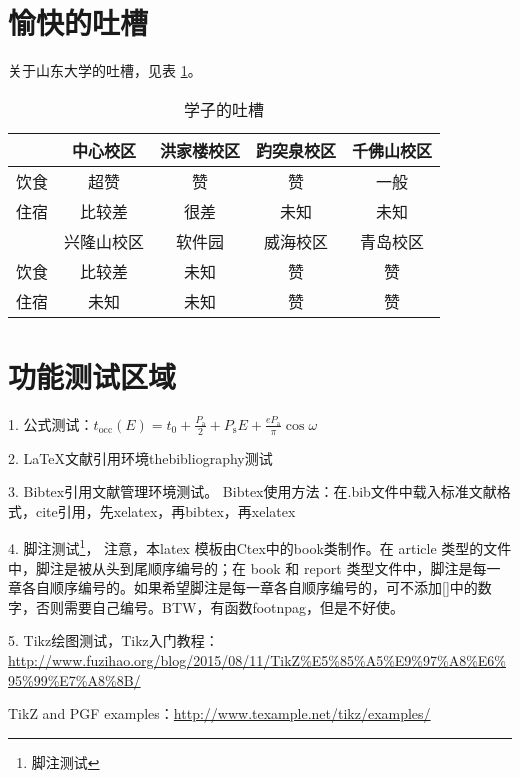 \documentclass[openany]{sduthesis} %
\begin{document}
\section{愉快的吐槽}

关于山东大学的吐槽，见表 \ref{tab:debunk}。

\begin{table}[!htb]
\centering
\caption{学子的吐槽}\label{tab:debunk}
\begin{tabular}{*5{c}}
  \toprule
  & 中心校区 & 洪家楼校区 & 趵突泉校区 & 千佛山校区 \\
  \midrule
  饮食 & 超赞 & 赞 & 赞 & 一般 \\
  住宿 & 比较差 & 很差 & 未知 & 未知\\
  \midrule[0.8pt]
  & 兴隆山校区 & 软件园 & 威海校区 & 青岛校区 \\
  \midrule
  饮食 & 比较差 & 未知 & 赞 & 赞 \\
  住宿 & 未知 & 未知 & 赞 & 赞\\
  \bottomrule
\end{tabular}
\end{table}
\clearpage
\section{功能测试区域}
1. 公式测试：$t_{\mathrm{occ}}(E)=t_{0}+\frac{P_{\mathrm{a}}}{2}+P_{\mathrm{s}} E+\frac{e P_{\mathrm{a}}}{\pi} \cos \omega$

2. \LaTeX 文献引用环境thebibliography测试

3. Bibtex引用文献管理环境测试\cite{DBLP:journals/sac/Braak06}。
Bibtex使用方法：在.bib文件中载入标准文献格式，cite引用，先xelatex，再bibtex，再xelatex

4. 脚注测试\footnote[1]{\label{footnoot1}脚注测试}， 注意，本latex 模板由Ctex中的book类制作。在 article 类型的文件中，脚注是被从头到尾顺序编号的；在 book 和 report 类型文件中，脚注是每一章各自顺序编号的。如果希望脚注是每一章各自顺序编号的，可不添加[]中的数字，否则需要自己编号。BTW，有函数footnpag，但是不好使。


5. Tikz绘图测试，Tikz入门教程：\url{http://www.fuzihao.org/blog/2015/08/11/TikZ%E5%85%A5%E9%97%A8%E6%95%99%E7%A8%8B/}

TikZ and PGF examples：\href{http://www.texample.net/tikz/examples/}{http://www.texample.net/tikz/examples/}


\begin{center}
\end{center}
\end{document}
